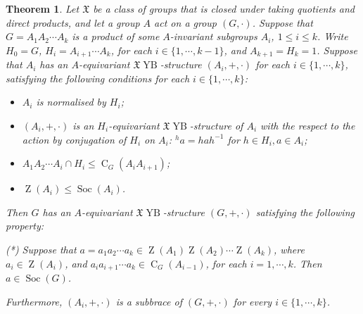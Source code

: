 \documentclass[12pt,a4paper]{article}
\newcommand\XX{\mathfrak{X}}
\DeclareMathOperator{\C}{C}
\DeclareMathOperator{\Soc}{Soc}
\DeclareMathOperator{\Z}{Z}
\DeclareMathOperator{\Ker}{Ker}
\DeclareMathOperator{\YB}{YB}
\newtheorem{athm}{Theorem}
\theoremstyle{definition}
\begin{document}



\begin{athm}\label{thm-main}\label{thm-skew-nilpotent-type}
Let $\mathfrak{X}$ be a class of groups that is closed under taking quotients and direct products, and let a group $A$ act on a group $(G, \cdot)$. Suppose that $G=A_1A_2\cdots A_k$ is a product of some $A$-invariant subgroups $A_i$,  $1 \leq i \leq k$. Write $H_0=G$, $H_i=A_{i+1}\cdots A_k$, for each $i \in \{1, \cdots,k-1\}$, and $A_{k+1} = H_k = 1$.
Suppose that $A_i$ has an $A$-equivariant $\XX\YB$-structure
$(A_i, +, \cdot)$
for each $i \in \{1, \cdots,k\}$, satisfying
the following conditions for each $i \in \{1, \cdots, k\}$:
\begin{itemize}
\item[\emph{(1)}] $A_i$ is normalised by $H_{i}$;
\item[\emph{(2)}] $(A_i, +, \cdot)$ is an $H_i$-equivariant $\XX\YB$-structure of $A_i$ with the respect to the action by conjugation of $H_i$ on $A_i$: ${}^ha=hah^{-1}$ for $h \in H_i, a \in A_i$;
\item[\emph{(3)}] $A_1A_2\cdots A_i \cap H_i \leq \C_G(A_iA_{i+1})$;
\item[\emph{(4)}] $\Z(A_i)\leq \Soc(A_i)$.
\end{itemize}
Then $G$ has an $A$-equivariant $\XX\YB$-structure $(G, +, \cdot)$ satisfying the following property:

(*) Suppose that $a=a_1a_2\cdots a_k\in \Z(A_1)\Z(A_2)\cdots \Z(A_k)$, where $a_i\in \Z(A_i)$, and $a_ia_{i+1}\cdots a_k\in \C_G(A_{i-1})$, for each $i=1, \cdots,k$. Then  $a \in \Soc(G)$.

Furthermore, $(A_i,+,\cdot)$ is a subbrace of $(G,+,\cdot)$ for every $i \in \{1, \cdots,k\}$.
\end{athm}
\end{document}
